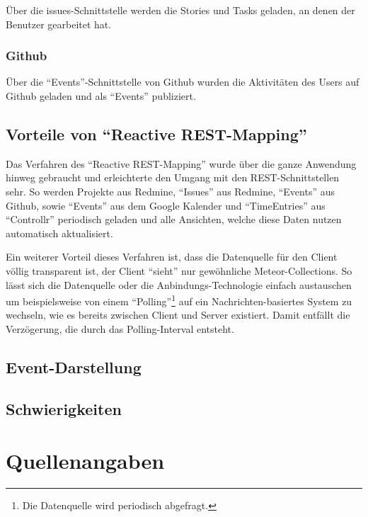 \documentclass[]{article}
\begin{document}
Über die issues-Schnittstelle werden die Stories und Tasks geladen, an
denen der Benutzer gearbeitet hat.

\subsubsection{Github}\label{github-1}

Über die ``Events''-Schnittstelle von Github wurden die Aktivitäten des
Users auf Github geladen und als ``Events'' publiziert.

\subsection{\texorpdfstring{Vorteile von ``Reactive
REST-Mapping''}{Vorteile von Reactive REST-Mapping}}\label{vorteile-von-reactive-rest-mapping}

Das Verfahren des ``Reactive REST-Mapping'' wurde über die ganze
Anwendung hinweg gebraucht und erleichterte den Umgang mit den
REST-Schnittstellen sehr. So werden Projekte aus Redmine, ``Issues'' aus
Redmine, ``Events'' aus Github, sowie ``Events'' aus dem Google Kalender
und ``TimeEntries'' aus ``Controllr'' periodisch geladen und alle
Ansichten, welche diese Daten nutzen automatisch aktualisiert.

Ein weiterer Vorteil dieses Verfahren ist, dass die Datenquelle für den
Client völlig transparent ist, der Client ``sieht'' nur gewöhnliche
Meteor-Collections. So lässt sich die Datenquelle oder die
Anbindungs-Technologie einfach austauschen um beispielsweise von einem
``Polling''\footnote{Die Datenquelle wird periodisch abgefragt.} auf ein
Nachrichten-basiertes System zu wechseln, wie es bereits zwischen Client
und Server existiert. Damit entfällt die Verzögerung, die durch das
Polling-Interval entsteht.

\subsection{Event-Darstellung}\label{event-darstellung}

\subsection{Schwierigkeiten}\label{schwierigkeiten}

\newpage
\appendix

\section*{Quellenangaben}\label{quellenangaben}
\end{document}
